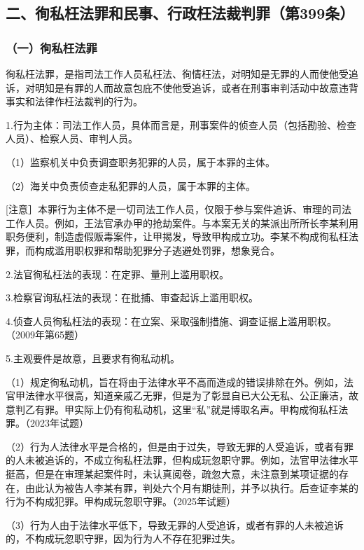\subsection*{二、徇私枉法罪和民事、行政枉法裁判罪（第399条）}

\subsubsection*{（一）徇私枉法罪}

徇私枉法罪，是指司法工作人员私枉法、徇情枉法，对明知是无罪的人而使他受追诉，对明知是有罪的人而故意包庇不使他受追诉，或者在刑事审判活动中故意违背事实和法律作枉法裁判的行为。

1.行为主体：司法工作人员，具体而言是，刑事案件的侦查人员（包括勘验、检查人员）、检察人员、审判人员。

（1）监察机关中负责调查职务犯罪的人员，属于本罪的主体。

（2）海关中负责侦查走私犯罪的人员，属于本罪的主体。

[注意］本罪行为主体不是一切司法工作人员，仅限于参与案件追诉、审理的司法工作人员。例如，王法官承办甲的抢劫案件。与本案无关的某派出所所长李某利用职务便利，制造虚假贩毒案件，让甲揭发，导致甲构成立功。李某不构成徇私枉法罪，而构成滥用职权罪和帮助犯罪分子逃避处罚罪，想象竞合。

2.法官徇私枉法的表现：在定罪、量刑上滥用职权。

3.检察官询私枉法的表现：在批捕、审查起诉上滥用职权。

4.侦查人员徇私枉法的表现：在立案、采取强制措施、调查证据上滥用职权。（2009年第65题）

5.主观要件是故意，且要求有徇私动机。

（1）规定徇私动机，旨在将由于法律水平不高而造成的错误排除在外。例如，法官甲法律水平很高，知道亲戚乙无罪，但是为了彰显自已大公无私、公正廉洁，故意判乙有罪。甲实际上仍有徇私动机，这里“私”就是博取名声。甲构成徇私枉法罪。（2023年试题）

（2）行为人法律水平是合格的，但是由于过失，导致无罪的人受追诉，或者有罪的人未被追诉的，不成立徇私枉法罪，但构成玩忽职守罪。例如，法官甲法律水平挺高，但是在审理某起案件时，未认真阅卷，疏忽大意，未注意到某项证据的存在，由此认为被告人李某有罪，判处六个月有期徒刑，并予以执行。后查证李某的行为不构成犯罪。甲构成玩忽职守罪。（2025年试题）

（3）行为人由于法律水平低下，导致无罪的人受追诉，或者有罪的人未被追诉的，不构成玩忽职守罪，因为行为人不存在犯罪过失。

